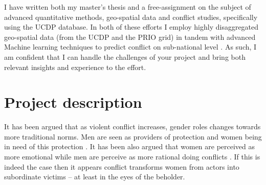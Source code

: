 \documentclass[a4paper]{article}
\begin{document}
I have written both my master's thesis \citep{SPECIALE} and a free-assignment \citep{Maase} on the subject of advanced quantitative methods, geo-spatial data and conflict studies, specifically using the UCDP database. In both of these efforts I employ highly disaggregated geo-spatial data (from the UCDP and the PRIO grid) in tandem with advanced Machine learning techniques to predict conflict on sub-national level \cite{Maase, SPECIALE}. As such, I am confident that I can handle the challenges of your project and bring both relevant insights and experience to the effort.\par


\section{Project description}




It has been argued that as violent conflict increases, gender roles changes towards more traditional norms. Men are seen as providers of protection and women being in need of this protection \citep{elshtain1995women, carpenter2003women}. It has been also argued that women are perceived as more emotional while men are perceive as more rational doing conflicts \citep{elshtain1993public}. If this is indeed the case then it appears conflict transforms women from actors into subordinate victims -- at least in the eyes of the beholder.\par 
\end{document}
